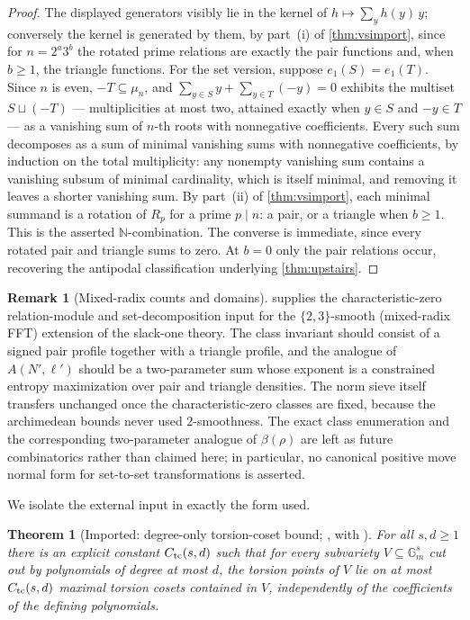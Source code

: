 \documentclass[11pt]{article}
\newtheorem{theorem}{Theorem}[section]
\theoremstyle{definition}
\newtheorem{remark}[remark]{Remark}
\newcommand{\N}{\mathbb N}
\newcommand{\mufn}{\mu_n}
\newcommand{\Acl}{A}
\begin{document}
\begin{proof}
The displayed generators visibly lie in the kernel of $h\mapsto\sum_yh(y)\,y$; conversely the kernel is generated by them, by part~(i) of \cref{thm:vsimport}, since for $n=2^a3^b$ the rotated prime relations are exactly the pair functions and, when $b\ge1$, the triangle functions.  For the set version, suppose $e_1(S)=e_1(T)$.  Since $n$ is even, $-T\subseteq\mufn$, and $\sum_{y\in S}y+\sum_{y\in T}(-y)=0$ exhibits the multiset $S\sqcup(-T)$ --- multiplicities at most two, attained exactly when $y\in S$ and $-y\in T$ --- as a vanishing sum of $n$-th roots with nonnegative coefficients.  Every such sum decomposes as a sum of minimal vanishing sums with nonnegative coefficients, by induction on the total multiplicity: any nonempty vanishing sum contains a vanishing subsum of minimal cardinality, which is itself minimal, and removing it leaves a shorter vanishing sum.  By part~(ii) of \cref{thm:vsimport}, each minimal summand is a rotation of $R_p$ for a prime $p\mid n$: a pair, or a triangle when $b\ge1$.  This is the asserted $\N$-combination.  The converse is immediate, since every rotated pair and triangle sums to zero.  At $b=0$ only the pair relations occur, recovering the antipodal classification underlying \cref{thm:upstairs}.
\end{proof}

\begin{remark}[Mixed-radix counts and domains]\label{rem:23count}
 supplies the characteristic-zero relation-module and set-decomposition input for the $\{2,3\}$-smooth (mixed-radix FFT) extension of the slack-one theory.  The class invariant should consist of a signed pair profile together with a triangle profile, and the analogue of $\Acl(N',\ell')$ should be a two-parameter sum whose exponent is a constrained entropy maximization over pair and triangle densities.  The norm sieve itself transfers unchanged once the characteristic-zero classes are fixed, because the archimedean bounds never used $2$-smoothness.  The exact class enumeration and the corresponding two-parameter analogue of $\beta(\rho)$ are left as future combinatorics rather than claimed here; in particular, no canonical positive move normal form for set-to-set transformations is asserted.
\end{remark}

We isolate the external input in exactly the form used.

\begin{theorem}[Imported: degree-only torsion-coset bound; \cite{AS12}, with \cite{Laurent84,ESS02,BS02}]\label{thm:torsionimport}
For all $s,d\ge1$ there is an explicit constant $C_{\rm tc}(s,d)$ such that for every subvariety $V\subseteq\mathbb G_m^s$ cut out by polynomials of degree at most $d$, the torsion points of $V$ lie on at most $C_{\rm tc}(s,d)$ maximal torsion cosets contained in $V$, independently of the coefficients of the defining polynomials.
\end{theorem}
\end{document}
